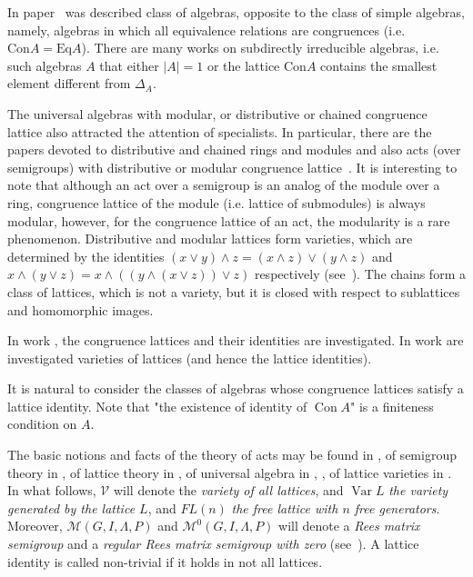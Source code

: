 \documentclass{birkau}
\numberwithin{equation}{section}
\theoremstyle{plain}
\theoremstyle{definition}
\DeclareMathOperator{\Con}{Con}
\DeclareMathOperator{\Var}{Var}
\begin{document}
	In paper~\cite{resh} was described class of algebras, opposite to the class of simple algebras, namely, algebras in which all equivalence relations are congruences (i.e. $ \text{Con}A = \text{Eq}A $).
    There are many works on subdirectly irreducible algebras, i.e. such algebras $A$ that either $ |A| = 1 $ or the lattice Con$A$ contains the smallest element different from $ \Delta_A $.
	
	The universal algebras with modular, or distributive or chained congruence lattice also attracted the attention of specialists. In particular, there are the papers devoted to distributive and chained rings and modules and also acts (over semigroups) with distributive or modular congruence lattice~\cite{step,hal3}. It is interesting to note that although an act over a semigroup is an analog of the module over a ring, congruence lattice of the module (i.e. lattice of submodules) is always modular, however, for the congruence lattice of an act, the modularity is a rare phenomenon. Distributive and modular lattices form varieties, which are determined by the identities $ (x \vee y) \wedge z = (x \wedge z ) \vee (y \wedge z) $ and $ x \wedge ( y \vee z ) = x \wedge (( y \wedge (x \vee z)) \vee z ) $ respectively (see~\cite[Chapter 4, Theorem 1.1]{gretz}).  The chains form a class of lattices, which is not a variety, but it is closed with respect to sublattices and homomorphic images.
	
    In work \cite{memoirs}, the congruence lattices and their identities are investigated. In work \cite{jipsen} are investigated varieties of lattices (and hence the lattice identities).
    
    It is natural to consider the classes of algebras whose congruence lattices satisfy a lattice identity.	
    Note that "the existence of identity of $\Con A$" is a finiteness condition on $A$.
    
    The basic notions and facts of the theory of acts may be found in \cite{kilp}, of semigroup theory in \cite{cliff}, of lattice theory in  \cite{gretz}, of universal algebra in \cite{burris}, \cite{kon}, of lattice varieties in \cite{jipsen}. 	
    In what follows, $\mathcal{V}$ will denote the \textit{variety of all lattices}, and $\Var L$ \textit{the variety generated by the lattice $L$}, and $FL(n)$ \textit{the free lattice with $n$ free generators}. Moreover, $\mathcal{M}(G,I,\Lambda,P)$ and $\mathcal{M}^0(G,I,\Lambda,P)$ will denote a \textit{Rees matrix semigroup} and a \textit{regular Rees matrix semigroup with zero} (see~\cite[Chapter 2]{cliff}). A lattice identity is called non-trivial if it holds in not all lattices.
	
\end{document}
